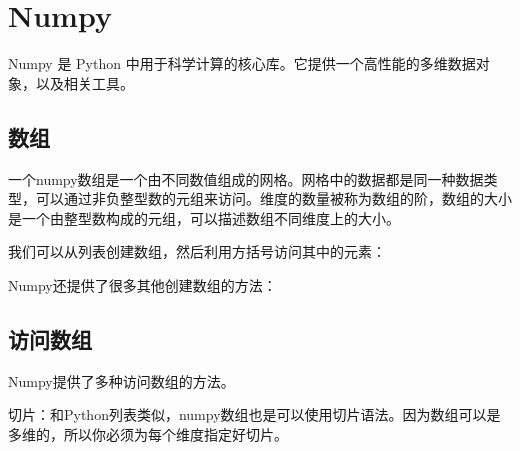 \section{Numpy}


Numpy 是 Python 中用于科学计算的核心库。它提供一个高性能的多维数据对象，以及相关工具。 

\subsection{数组}

%

一个numpy数组是一个由不同数值组成的网格。网格中的数据都是同一种数据类型，可以通过非负整型数的元组来访问。维度的数量被称为数组的阶，数组的大小是一个由整型数构成的元组，可以描述数组不同维度上的大小。

我们可以从列表创建数组，然后利用方括号访问其中的元素：





Numpy还提供了很多其他创建数组的方法：



\subsection{访问数组}

%

Numpy提供了多种访问数组的方法。

切片：和Python列表类似，numpy数组也是可以使用切片语法。因为数组可以是多维的，所以你必须为每个维度指定好切片。


